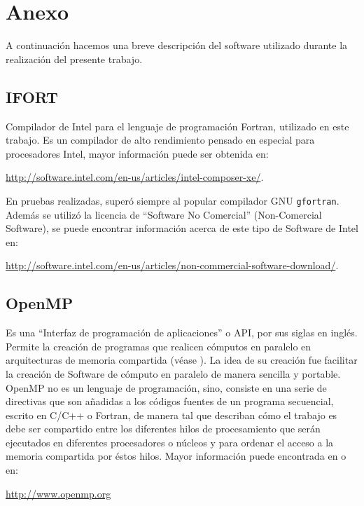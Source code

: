 \section*{Anexo}
\fancyhf{}
\fancyfoot[L]{\titlem}
\fancyfoot[R]{\thepage} 
\setcounter{section}{1}
\setcounter{subsection}{0}
\renewcommand{\thesection}{\Alph{section}}
A continuaci\'on hacemos una breve descripci\'on del software utilizado durante la realizaci\'on del presente trabajo.

\subsection{IFORT}\qquad Compilador de Intel para el lenguaje de programaci\'on Fortran, utilizado en este trabajo. Es un compilador de alto rendimiento pensado en especial para procesadores Intel, mayor informaci\'on puede ser obtenida en:
\begin{center}
 \url{http://software.intel.com/en-us/articles/intel-composer-xe/}.
\end{center}

\qquad En pruebas realizadas, super\'o siempre al popular compilador GNU \verb|gfortran|. Adem\'as se utiliz\'o la licencia de ``Software No Comercial'' (Non-Comercial Software), se puede encontrar informaci\'on acerca de este tipo de Software de Intel en:
\begin{center}
\url{http://software.intel.com/en-us/articles/non-commercial-software-download/}.\\
\end{center}

\subsection{OpenMP}\qquad Es una ``Interfaz de programaci\'on de aplicaciones'' o API, por sus siglas en ingl\'es. Permite la creaci\'on de programas que realicen c\'omputos en paralelo en arquitecturas de memoria compartida (v\'ease \cite{arquitectura_pcs}). La idea de su creaci\'on fue facilitar la creaci\'on de Software de c\'omputo en paralelo de manera sencilla y portable. OpenMP no es un lenguaje de programaci\'on, sino, consiste en una serie de directivas que son a\~nadidas a los c\'odigos fuentes de un programa secuencial, escrito en C/C++ o Fortran, de manera tal que describan c\'omo el trabajo es debe ser compartido entre los diferentes hilos de procesamiento que ser\'an ejecutados en diferentes procesadores o n\'ucleos y para ordenar el acceso a la memoria compartida por \'estos hilos. Mayor informaci\'on puede encontrada en \cite{openmp} o en:
\begin{center}
\url{http://www.openmp.org}\\
\end{center}

